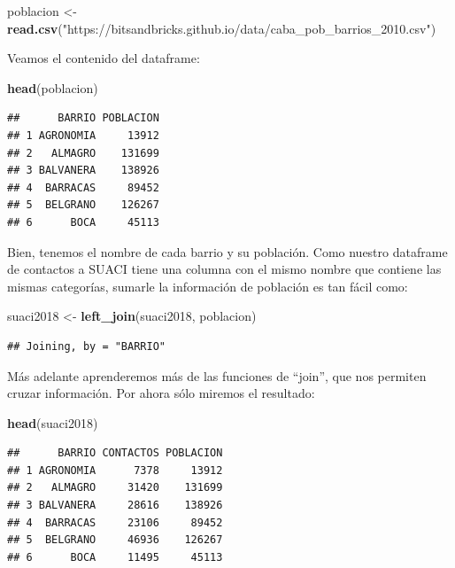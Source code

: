 \documentclass[]{book}
\newenvironment{Shaded}{\begin{snugshade}}{\end{snugshade}}
\newcommand{\KeywordTok}[1]{\textcolor[rgb]{0.13,0.29,0.53}{\textbf{#1}}}
\newcommand{\StringTok}[1]{\textcolor[rgb]{0.31,0.60,0.02}{#1}}
\newcommand{\NormalTok}[1]{#1}
\begin{document}
\begin{Shaded}
\begin{Highlighting}[]
\NormalTok{poblacion <-}\StringTok{ }\KeywordTok{read.csv}\NormalTok{(}\StringTok{"https://bitsandbricks.github.io/data/caba_pob_barrios_2010.csv"}\NormalTok{)}
\end{Highlighting}
\end{Shaded}

Veamos el contenido del dataframe:

\begin{Shaded}
\begin{Highlighting}[]
\KeywordTok{head}\NormalTok{(poblacion)}
\end{Highlighting}
\end{Shaded}

\begin{verbatim}
##      BARRIO POBLACION
## 1 AGRONOMIA     13912
## 2   ALMAGRO    131699
## 3 BALVANERA    138926
## 4  BARRACAS     89452
## 5  BELGRANO    126267
## 6      BOCA     45113
\end{verbatim}

Bien, tenemos el nombre de cada barrio y su población. Como nuestro
dataframe de contactos a SUACI tiene una columna con el mismo nombre que
contiene las mismas categorías, sumarle la información de población es
tan fácil como:

\begin{Shaded}
\begin{Highlighting}[]
\NormalTok{suaci2018 <-}\StringTok{ }\KeywordTok{left_join}\NormalTok{(suaci2018, poblacion)}
\end{Highlighting}
\end{Shaded}

\begin{verbatim}
## Joining, by = "BARRIO"
\end{verbatim}

Más adelante aprenderemos más de las funciones de ``join'', que nos
permiten cruzar información. Por ahora sólo miremos el resultado:

\begin{Shaded}
\begin{Highlighting}[]
\KeywordTok{head}\NormalTok{(suaci2018)}
\end{Highlighting}
\end{Shaded}

\begin{verbatim}
##      BARRIO CONTACTOS POBLACION
## 1 AGRONOMIA      7378     13912
## 2   ALMAGRO     31420    131699
## 3 BALVANERA     28616    138926
## 4  BARRACAS     23106     89452
## 5  BELGRANO     46936    126267
## 6      BOCA     11495     45113
\end{verbatim}
\end{document}
